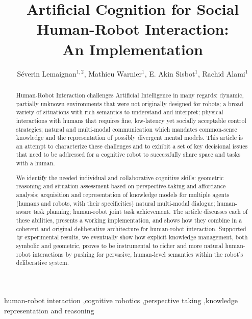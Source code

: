\documentclass[preprint,3p,times]{elsarticle}
\begin{document}
\begin{frontmatter}

\title{\LARGE \bf
Artificial Cognition for Social Human-Robot Interaction:\\ An Implementation
}

\author{Séverin Lemaignan$^{1,2}$, Mathieu Warnier$^1$, E. Akin Sisbot$^1$,
Rachid Alami$^1$}

\address{
$^1$LAAS-CNRS, Univ. de Toulouse, CNRS\\
7 avenue du Colonel Roche, F-31400 Toulouse, France\\
{\tt firstname.surname@laas.fr}
}

\address{
$^2$Centre for Robotics and Neural Systems\\
Plymouth University, Plymouth, United Kingdom\\
{\tt firstname.surname@plymouth.ac.uk}
}



\begin{abstract}

Human-Robot Interaction challenges Artificial Intelligence in many regards:
dynamic, partially unknown environments that were not originally designed for
robots; a broad variety of situations with rich semantics to understand and
interpret; physical interactions with humans that requires fine, low-latency yet
socially acceptable control strategies; natural and multi-modal communication
which mandates common-sense knowledge and the representation of possibly
divergent mental models. This article is an attempt to characterize these challenges
and to exhibit a set of key decisional issues that need to be addressed for a
cognitive robot to successfully share space and tasks with a human.

We identify the needed individual and collaborative cognitive
skills: geometric reasoning and situation assessment based on perspective-taking
and affordance analysis; acquisition and representation of knowledge models for
multiple agents (humans and robots, with their specificities) natural multi-modal dialogue;
human-aware task planning; human-robot joint task achievement.  The article
discusses each of these abilities, presents a working implementation, and shows
how they combine in a coherent and original deliberative architecture for
human-robot interaction. Supported by experimental results, we eventually show
how explicit knowledge management, both symbolic and geometric, proves to be
instrumental to richer and more natural human-robot interactions by pushing for
pervasive, human-level semantics within the robot's deliberative system.

\end{abstract}

\begin{keyword}
    human-robot interaction \sep cognitive robotics \sep perspective taking \sep knowledge representation and reasoning
\end{keyword}

\end{frontmatter}
\end{document}
